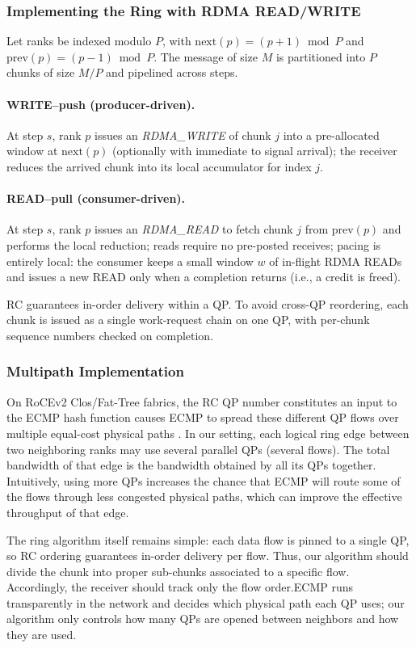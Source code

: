 \documentclass[12pt]{article}
\begin{document}
\subsubsection{Implementing the Ring with RDMA READ/WRITE}
Let ranks be indexed modulo $P$, with $\mathrm{next}(p)=(p+1)\bmod P$ and $\mathrm{prev}(p)=(p-1)\bmod P$. The message of size $M$ is partitioned into $P$ chunks of size $M/P$ and pipelined across steps.
\paragraph{WRITE–push (producer-driven).}
At step $s$, rank $p$ issues an \textit{RDMA\_WRITE} of chunk $j$ into a pre-allocated window at $\mathrm{next}(p)$ (optionally with immediate to signal arrival); the receiver reduces the arrived chunk into its local accumulator for index $j$.
\paragraph{READ–pull (consumer-driven).}
At step $s$, rank $p$ issues an \textit{RDMA\_READ} to fetch chunk $j$ from $\mathrm{prev}(p)$ and performs the local reduction; reads require no pre-posted receives; pacing is entirely local: the consumer keeps a small window $w$ of in-flight RDMA READs and issues a new READ only when a completion returns (i.e., a credit is freed).

RC guarantees in-order delivery within a QP. To avoid cross-QP reordering, each chunk is issued as a single work-request chain on one QP, with per-chunk sequence numbers checked on completion. 


\subsubsection{Multipath Implementation}
On RoCEv2 Clos/Fat-Tree fabrics, the RC QP number constitutes an input to the ECMP hash function causes ECMP to spread these different QP flows over multiple equal-cost physical paths \cite{hopps2000rfc2992,zhu2015dcqcn}.
In our setting, each logical ring edge between two neighboring ranks may use several parallel QPs (several flows). The total bandwidth of that edge is the bandwidth obtained by all its QPs together. Intuitively, using more QPs increases the chance that ECMP will route some of the flows through less congested physical paths, which can improve the effective throughput of that edge.

The ring algorithm itself remains simple: each data flow is pinned to a single QP, so RC ordering guarantees in-order delivery per flow.
Thus, our algorithm should divide the chunk into proper sub-chunks associated to a specific flow. Accordingly, the receiver should track only the flow order.ECMP runs transparently in the network and decides which physical path each QP uses; our algorithm only controls how many QPs are opened between neighbors and how they are used.
\end{document}
